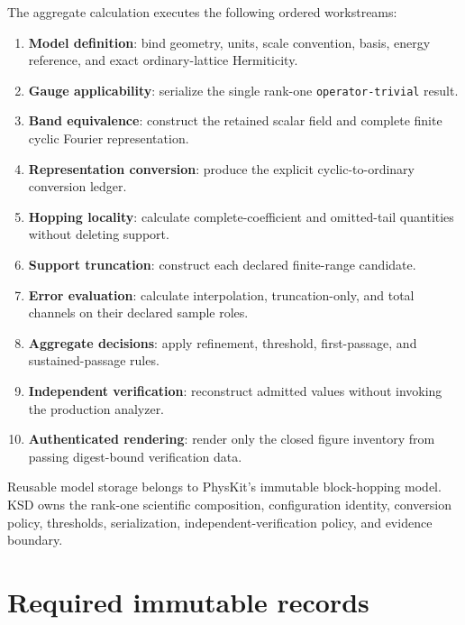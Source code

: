 \documentclass[11pt]{article}
\begin{document}
The aggregate calculation executes the following ordered workstreams:
\begin{enumerate}[leftmargin=*]
  \item \textbf{Model definition}: bind geometry, units, scale convention, basis,
    energy reference, and exact ordinary-lattice Hermiticity.
  \item \textbf{Gauge applicability}: serialize the single rank-one
    \texttt{operator-trivial} result.
  \item \textbf{Band equivalence}: construct the retained scalar field and complete
    finite cyclic Fourier representation.
  \item \textbf{Representation conversion}: produce the explicit cyclic-to-ordinary
    conversion ledger.
  \item \textbf{Hopping locality}: calculate complete-coefficient and omitted-tail
    quantities without deleting support.
  \item \textbf{Support truncation}: construct each declared finite-range candidate.
  \item \textbf{Error evaluation}: calculate interpolation, truncation-only, and total
    channels on their declared sample roles.
  \item \textbf{Aggregate decisions}: apply refinement, threshold, first-passage, and
    sustained-passage rules.
  \item \textbf{Independent verification}: reconstruct admitted values without invoking
    the production analyzer.
  \item \textbf{Authenticated rendering}: render only the closed figure inventory from
    passing digest-bound verification data.
\end{enumerate}

Reusable model storage belongs to PhysKit's immutable block-hopping model.  KSD owns the
rank-one scientific composition, configuration identity, conversion policy, thresholds,
serialization, independent-verification policy, and evidence boundary.

\section{Required immutable records}
\end{document}
